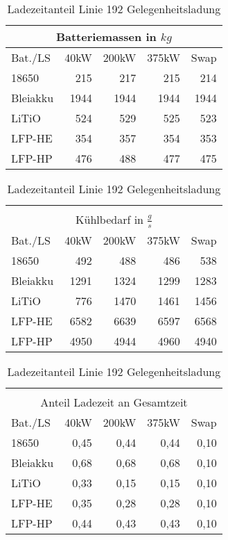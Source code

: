 \begin{table}
	\begin{minipage}{0.45\textwidth}
		\centering
		\begin{tabular}{lrrrr}
			\multicolumn{5}{c}{Batteriemassen in $kg$}  \\ \toprule
			Bat./LS  & 40kW & 200kW & 375kW &     Swap  \\ \midrule
			18650    &  215 &   217 &   215 &      214  \\
			Bleiakku & 1944 &  1944 &  1944 &     1944  \\
			LiTiO    &  524 &   529 &   525 &      523  \\
			LFP-HE   &  354 &   357 &   354 &      353  \\
			LFP-HP   &  476 &   488 &   477 &      475  \\ \bottomrule
		\end{tabular} 
		\caption{Batteriemassen Linie 192 Gelegnheitsladung}
		\label{192_a}
		
		\begin{tabular}{lrrrr}
			         &      &       &       &  \\
			\multicolumn{5}{c}{Kühlbedarf in $\frac{g}{s}$}   \\ \toprule
			Bat./LS  & 40kW & 200kW & 375kW &          Swap   \\ \midrule
			18650    &  492 &   488 &   486 &           538  \\
			Bleiakku & 1291 &  1324 &  1299 &          1283   \\
			LiTiO    &  776 &  1470 &  1461 &          1456   \\
			LFP-HE   & 6582 &  6639 &  6597 &          6568   \\
			LFP-HP   & 4950 &  4944 &  4960 &          4940   \\ \bottomrule
		\end{tabular} 
		\caption{Kühlungsbedarf Linie 192 Gelegenheitsladung}
		
		\begin{tabular}{lrrrr}
			         &      &       &       &  \\
			\multicolumn{5}{c}{Anteil Ladezeit an Gesamtzeit} \\ \toprule
			Bat./LS  & 40kW & 200kW & 375kW &            Swap \\ \midrule
			18650    & 0,45 &  0,44 &  0,44 &            0,10 \\
			Bleiakku & 0,68 &  0,68 &  0,68 &            0,10 \\
			LiTiO    & 0,33 &  0,15 &  0,15 &            0,10 \\
			LFP-HE   & 0,35 &  0,28 &  0,28 &            0,10 \\
			LFP-HP   & 0,44 &  0,43 &  0,43 &            0,10 \\ \bottomrule
		\end{tabular} 
		\caption{Ladezeitanteil Linie 192 Gelegenheitsladung}
		

\end{minipage}
\end{table}
